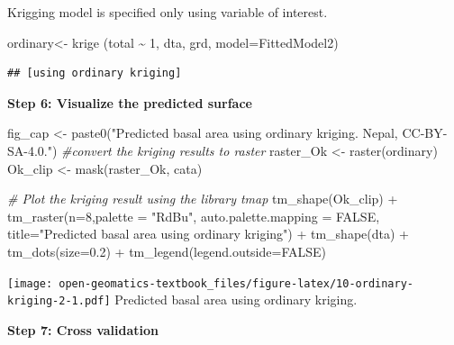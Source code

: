 \documentclass[
]{book}
\newenvironment{Shaded}{\begin{snugshade}}{\end{snugshade}}
\newcommand{\AttributeTok}[1]{\textcolor[rgb]{0.77,0.63,0.00}{#1}}
\newcommand{\CommentTok}[1]{\textcolor[rgb]{0.56,0.35,0.01}{\textit{#1}}}
\newcommand{\ConstantTok}[1]{\textcolor[rgb]{0.00,0.00,0.00}{#1}}
\newcommand{\DecValTok}[1]{\textcolor[rgb]{0.00,0.00,0.81}{#1}}
\newcommand{\FloatTok}[1]{\textcolor[rgb]{0.00,0.00,0.81}{#1}}
\newcommand{\FunctionTok}[1]{\textcolor[rgb]{0.00,0.00,0.00}{#1}}
\newcommand{\NormalTok}[1]{#1}
\newcommand{\OtherTok}[1]{\textcolor[rgb]{0.56,0.35,0.01}{#1}}
\newcommand{\SpecialCharTok}[1]{\textcolor[rgb]{0.00,0.00,0.00}{#1}}
\newcommand{\StringTok}[1]{\textcolor[rgb]{0.31,0.60,0.02}{#1}}
\begin{document}
Krigging model is specified only using variable of interest.

\begin{Shaded}
\begin{Highlighting}[]
\NormalTok{ordinary}\OtherTok{\textless{}{-}} \FunctionTok{krige}\NormalTok{ (total }\SpecialCharTok{\textasciitilde{}} \DecValTok{1}\NormalTok{, dta, grd, }\AttributeTok{model=}\NormalTok{FittedModel2)}
\end{Highlighting}
\end{Shaded}

\begin{verbatim}
## [using ordinary kriging]
\end{verbatim}

\textbf{Step 6: Visualize the predicted surface}

\begin{Shaded}
\begin{Highlighting}[]
\NormalTok{fig\_cap }\OtherTok{\textless{}{-}} \FunctionTok{paste0}\NormalTok{(}\StringTok{"Predicted basal area using ordinary kriging. Nepal, CC{-}BY{-}SA{-}4.0."}\NormalTok{)}
\CommentTok{\#convert the kriging results to raster}
\NormalTok{raster\_Ok      }\OtherTok{\textless{}{-}} \FunctionTok{raster}\NormalTok{(ordinary)}
\NormalTok{Ok\_clip    }\OtherTok{\textless{}{-}} \FunctionTok{mask}\NormalTok{(raster\_Ok, cata)}

\CommentTok{\# Plot the kriging result using the library tmap}
\FunctionTok{tm\_shape}\NormalTok{(Ok\_clip) }\SpecialCharTok{+} 
  \FunctionTok{tm\_raster}\NormalTok{(}\AttributeTok{n=}\DecValTok{8}\NormalTok{,}\AttributeTok{palette =} \StringTok{"RdBu"}\NormalTok{, }\AttributeTok{auto.palette.mapping =} \ConstantTok{FALSE}\NormalTok{,}
            \AttributeTok{title=}\StringTok{"Predicted basal area using ordinary kriging"}\NormalTok{) }\SpecialCharTok{+} 
  \FunctionTok{tm\_shape}\NormalTok{(dta) }\SpecialCharTok{+} \FunctionTok{tm\_dots}\NormalTok{(}\AttributeTok{size=}\FloatTok{0.2}\NormalTok{) }\SpecialCharTok{+}
  \FunctionTok{tm\_legend}\NormalTok{(}\AttributeTok{legend.outside=}\ConstantTok{FALSE}\NormalTok{)}
\end{Highlighting}
\end{Shaded}

\texttt{[image: open-geomatics-textbook\_files/figure-latex/10-ordinary-kriging-2-1.pdf]}
Predicted basal area using ordinary kriging.

\textbf{Step 7: Cross validation}
\end{document}
